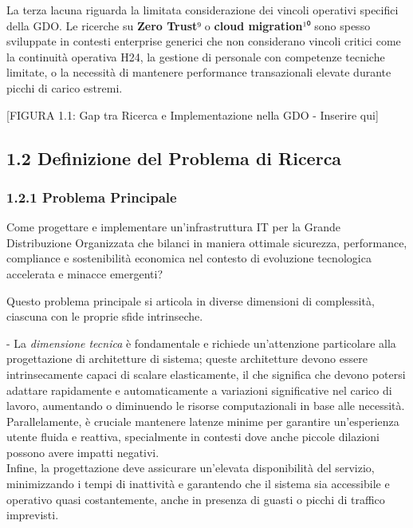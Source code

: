 \documentclass{report}
\begin{document}
La terza lacuna riguarda la limitata considerazione dei vincoli
operativi specifici della GDO. Le ricerche su \textbf{Zero Trust}⁹ o
\textbf{cloud migration}¹⁰ sono spesso sviluppate in contesti enterprise
generici che non considerano vincoli critici come la continuità
operativa H24, la gestione di personale con competenze tecniche
limitate, o la necessità di mantenere performance transazionali elevate
durante picchi di carico estremi.

{[}FIGURA 1.1: Gap tra Ricerca e Implementazione nella GDO - Inserire
qui{]}

\subsection{\texorpdfstring{\textbf{1.2 Definizione del Problema di
Ricerca}}{1.2 Definizione del Problema di Ricerca}}\label{definizione-del-problema-di-ricerca}

\subsubsection{\texorpdfstring{\textbf{1.2.1 Problema
Principale}}{1.2.1 Problema Principale}}\label{problema-principale}

Come progettare e implementare un'infrastruttura IT per la Grande
Distribuzione Organizzata che bilanci in maniera ottimale sicurezza,
performance, compliance e sostenibilità economica nel contesto di
evoluzione tecnologica accelerata e minacce emergenti?

Questo problema principale si articola in diverse dimensioni di
complessità, ciascuna con le proprie sfide intrinseche.

- La \emph{dimensione tecnica} è fondamentale e richiede un'attenzione
particolare alla progettazione di architetture di sistema; queste
architetture devono essere intrinsecamente capaci di scalare
elasticamente, il che significa che devono potersi adattare rapidamente
e automaticamente a variazioni significative nel carico di lavoro,
aumentando o diminuendo le risorse computazionali in base alle
necessità.\\
Parallelamente, è cruciale mantenere latenze minime per garantire
un'esperienza utente fluida e reattiva, specialmente in contesti dove
anche piccole dilazioni possono avere impatti negativi.\\
Infine, la progettazione deve assicurare un'elevata disponibilità del
servizio, minimizzando i tempi di inattività e garantendo che il sistema
sia accessibile e operativo quasi costantemente, anche in presenza di
guasti o picchi di traffico imprevisti.
\end{document}
